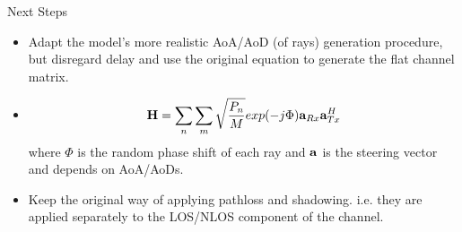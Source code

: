\documentclass{beamer}
\begin{document}
\begin{frame}{Next Steps}
    \begin{itemize}
        \item Adapt the model's more realistic AoA/AoD (of rays) generation procedure, but disregard delay and use the original equation to generate the flat channel matrix.
        \item$${\bf H} =  \sum_n \sum_m\sqrt{\frac{P_n}{M}} exp(-j\Phi){\bf a}_{Rx}{\bf a}_{Tx}^H$$
        where $\Phi$ is the random phase shift of each ray and ${\bf a}$ is the steering vector and depends on AoA/AoDs.
        \item Keep the original way of applying pathloss and shadowing. i.e. they are applied separately to the LOS/NLOS component of the channel.
    \end{itemize}
\end{frame}


\end{document}
